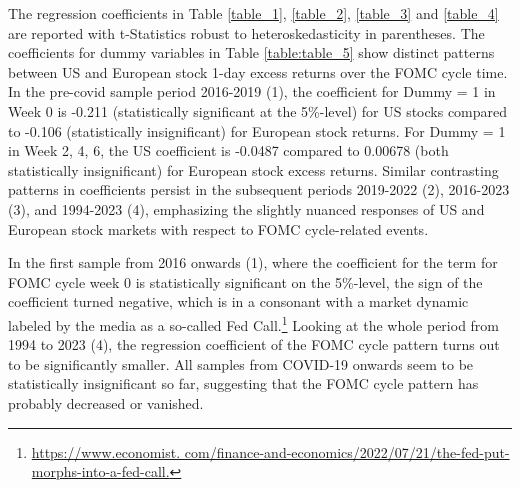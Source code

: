 The regression coefficients in Table \ref{table_1},  \ref{table_2},  \ref{table_3} and \ref{table_4} are reported with t-Statistics robust to heteroskedasticity in parentheses.
The coefficients for dummy variables in Table \ref{table:table_5} show distinct patterns between US and European stock 1-day excess returns over the FOMC cycle time.
In the pre-covid sample period 2016-2019 (1), the coefficient for Dummy = 1 in Week 0 is -0.211 (statistically significant at the 5\%-level) for US stocks compared to -0.106 (statistically insignificant) for European stock returns.
For Dummy = 1 in Week 2, 4, 6, the US coefficient is -0.0487 compared to 0.00678 (both statistically insignificant) for European stock excess returns.  Similar contrasting patterns in coefficients persist in the subsequent periods 2019-2022 (2), 2016-2023 (3), and 1994-2023 (4), emphasizing the slightly nuanced responses of US and European stock markets with respect to FOMC cycle-related events.


In the first sample from 2016 onwards (1), where the coefficient for the term for FOMC cycle week 0 is statistically significant on the 5\%-level, the sign of the coefficient turned negative, which is in a consonant with a market dynamic labeled by the media as a so-called Fed Call.\footnote{\url{https://www.economist. com/finance-and-economics/2022/07/21/the-fed-put-morphs-into-a-fed-call.}} Looking at the whole period from 1994 to 2023 (4), the regression coefficient of the FOMC cycle pattern turns out to be significantly smaller.  All samples from COVID-19 onwards seem to be statistically insignificant so far, suggesting that the FOMC cycle pattern has probably decreased or vanished.




